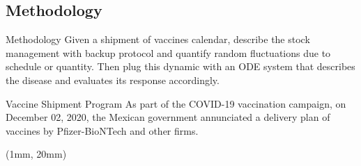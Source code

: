 \subsection{Methodology}
    \begin{frame}{Methodology}
        Given a shipment of vaccines calendar, describe the stock management with
        backup protocol and quantify random fluctuations due to schedule or
        quantity. Then plug this dynamic with an ODE system that describes the
        disease and evaluates its response accordingly.
    \end{frame}
%
\begin{frame}{Vaccine Shipment Program}
    As part of the COVID-19 vaccination campaign, on December 02, 2020, the
    Mexican government annunciated a delivery plan of vaccines by Pfizer-BioNTech
    and other firms.
    \begin{textblock*}{130mm}(1mm, 20mm)
    \end{textblock*}
 \end{frame}


